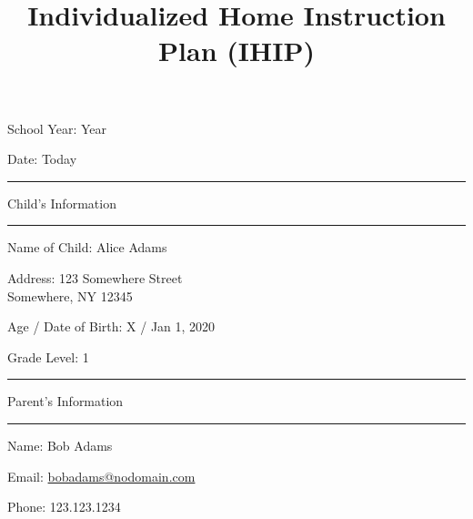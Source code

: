 \documentclass[10pt]{article}
\title{Individualized Home Instruction Plan (IHIP)}
\author{}
\date{}
\begin{document}
\maketitle
\begin{multicols}{2}
  School Year: Year

  Date: Today
\end{multicols}

\begin{center}
  \hrule

  \smallskip
  
  Child's Information

  \smallskip
  
  \hrule
\end{center}

\begin{multicols}{2}
  Name of Child: Alice Adams

  Address: 123 Somewhere Street\\
           \hspace*{13ex}Somewhere, NY 12345

  Age / Date of Birth: X / Jan 1, 2020

  Grade Level: 1
\end{multicols}

\begin{center}

  \hrule

  \smallskip
  
  Parent's Information

  \smallskip
  
  \hrule
\end{center}

\begin{multicols}{2}

  Name: Bob Adams

  Email: \href{mailto:bobadams@nodomain.com}{bobadams@nodomain.com}

  Phone: 123.123.1234
\end{multicols}
\end{document}

